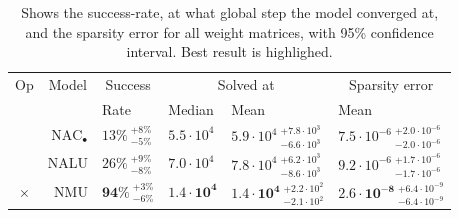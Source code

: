 \begin{table}[!h]

\caption{\label{tab:very-simple-function-results}Shows the success-rate, at what global step the model converged at, and the sparsity error for all weight matrices, with 95\% confidence interval. Best result is highlighed.}
\centering
\begin{tabular}{crllll}
\toprule
\multicolumn{1}{c}{Op} & \multicolumn{1}{c}{Model} & \multicolumn{1}{c}{Success} & \multicolumn{2}{c}{Solved at} & \multicolumn{1}{c}{Sparsity error} \\
\cmidrule(l{3pt}r{3pt}){1-1} \cmidrule(l{3pt}r{3pt}){2-2} \cmidrule(l{3pt}r{3pt}){3-3} \cmidrule(l{3pt}r{3pt}){4-5} \cmidrule(l{3pt}r{3pt}){6-6}
 &  & Rate & Median & Mean & Mean\\
\midrule
 & $\mathrm{NAC}_{\bullet}$ & $13\% {~}^{+8\%}_{-5\%}$ & $5.5 \cdot 10^{4}$ & $5.9 \cdot 10^{4} {~}^{+7.8 \cdot 10^{3}}_{-6.6 \cdot 10^{3}}$ & $7.5 \cdot 10^{-6} {~}^{+2.0 \cdot 10^{-6}}_{-2.0 \cdot 10^{-6}}$\\

 & NALU & $26\% {~}^{+9\%}_{-8\%}$ & $7.0 \cdot 10^{4}$ & $7.8 \cdot 10^{4} {~}^{+6.2 \cdot 10^{3}}_{-8.6 \cdot 10^{3}}$ & $9.2 \cdot 10^{-6} {~}^{+1.7 \cdot 10^{-6}}_{-1.7 \cdot 10^{-6}}$\\

\multirow{-3}{*}{\centering\arraybackslash $\bm{\times}$} & NMU & $\mathbf{94\%} {~}^{+3\%}_{-6\%}$ & $\mathbf{1.4 \cdot 10^{4}}$ & $\mathbf{1.4 \cdot 10^{4}} {~}^{+2.2 \cdot 10^{2}}_{-2.1 \cdot 10^{2}}$ & $\mathbf{2.6 \cdot 10^{-8}} {~}^{+6.4 \cdot 10^{-9}}_{-6.4 \cdot 10^{-9}}$\\
\bottomrule
\end{tabular}
\end{table}
